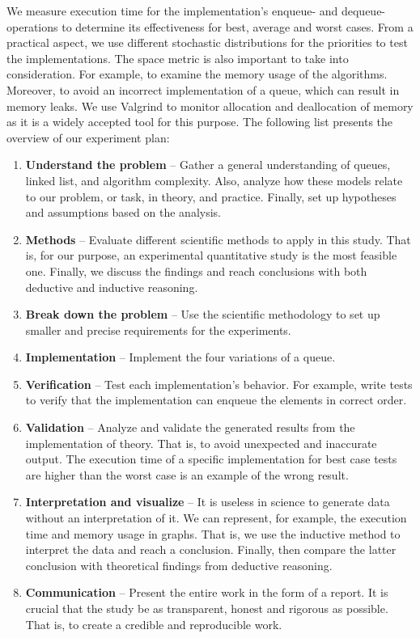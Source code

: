 \documentclass[a4paper,11pt]{kth-mag}
\newcommand*{\skippara}{\par\vspace{\baselineskip} \noindent}
\begin{document}
\skippara We measure execution time for the implementation's enqueue- and dequeue-operations to determine its effectiveness for best, average and worst cases.
From a practical aspect, we use different stochastic distributions for the priorities to test the implementations.
The space metric is also important to take into consideration.
For example, to examine the memory usage of the algorithms.
Moreover, to avoid an incorrect implementation of a queue, which can result in memory leaks.
We use Valgrind to monitor allocation and deallocation of memory as it is a widely accepted tool for this purpose.
The following list presents the overview of our experiment plan:
\begin{enumerate}
    \item \textbf{Understand the problem} --
        Gather a general understanding of queues, linked list, and algorithm complexity.
        Also, analyze how these models relate to our problem, or task, in theory, and practice.
        Finally, set up hypotheses and assumptions based on the analysis.
    \item \textbf{Methods} --
       Evaluate different scientific methods to apply in this study.
       That is, for our purpose, an experimental quantitative study is the most feasible one.
       Finally, we discuss the findings and reach conclusions with both deductive and inductive reasoning.
    \item \textbf{Break down the problem} --
       Use the scientific methodology to set up smaller and precise requirements for the experiments.
    \item \textbf{Implementation} -- Implement the four variations of a queue.
    \item \textbf{Verification} --
       Test each implementation's behavior.
       For example, write tests to verify that the implementation can enqueue the elements in correct order.
    \item \textbf{Validation} --
        Analyze and validate the generated results from the implementation of theory.
        That is, to avoid unexpected and inaccurate output.
        The execution time of a specific implementation for best case tests are higher than the worst case is an example of the wrong result.
    \item \textbf{Interpretation and visualize} --
        It is useless in science to generate data without an interpretation of it.
        We can represent, for example, the execution time and memory usage in graphs.
        That is, we use the inductive method to interpret the data and reach a conclusion.
        Finally, then compare the latter conclusion with theoretical findings from deductive reasoning.
    \item \textbf{Communication} --
        Present the entire work in the form of a report.
        It is crucial that the study be as transparent, honest and rigorous as possible.
        That is, to create a credible and reproducible work.
\end{enumerate}
\end{document}
